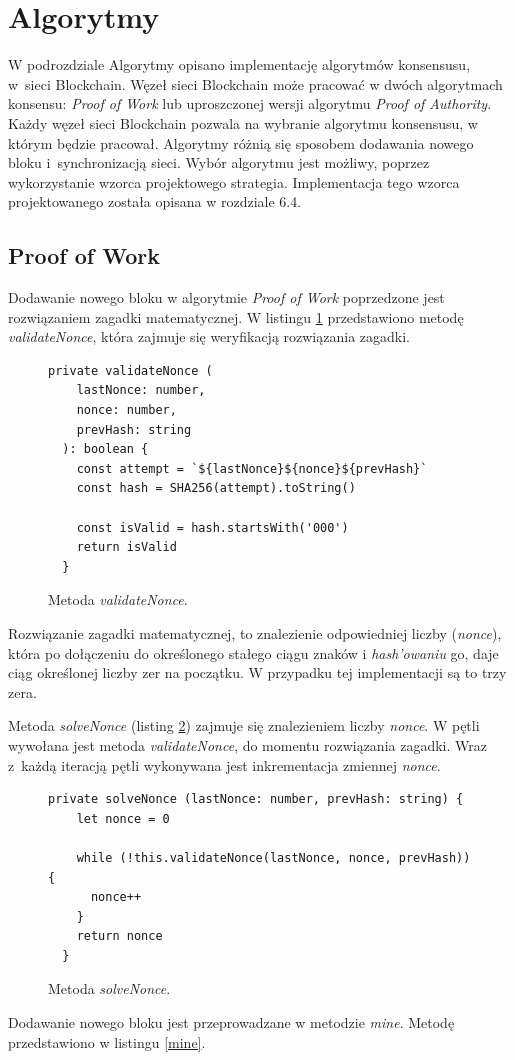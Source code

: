 \documentclass[a4paper,12pt]{book}
\begin{document}
\section{Algorytmy}

W podrozdziale Algorytmy opisano implementację algorytmów konsensusu, w~sieci Blockchain. Węzeł sieci Blockchain może pracować w dwóch algorytmach konsensu: \textit{Proof of Work} lub uproszczonej wersji algorytmu \textit{Proof of Authority}. Każdy węzeł sieci Blockchain pozwala na wybranie algorytmu konsensusu, w którym będzie pracował. Algorytmy różnią się sposobem dodawania nowego bloku i~synchronizacją sieci. Wybór algorytmu jest możliwy, poprzez wykorzystanie wzorca projektowego strategia. Implementacja tego wzorca projektowanego została opisana w rozdziale 6.4.

\subsection{Proof of Work}

Dodawanie nowego bloku w algorytmie \textit{Proof of Work} poprzedzone jest rozwiązaniem zagadki matematycznej. W listingu \ref{validateNonce} przedstawiono metodę \textit{validateNonce}, która zajmuje się weryfikacją rozwiązania zagadki.

\begin{figure}[H]  
  \centering
\begin{lstlisting}[style=ES6]
private validateNonce (
    lastNonce: number,
    nonce: number,
    prevHash: string
  ): boolean {
    const attempt = `${lastNonce}${nonce}${prevHash}`
    const hash = SHA256(attempt).toString()

    const isValid = hash.startsWith('000')
    return isValid
  }
\end{lstlisting}
\caption{Metoda \textit{validateNonce}.}
\label{validateNonce}
\end{figure}
Rozwiązanie zagadki matematycznej, to znalezienie odpowiedniej liczby (\textit{nonce}), która po dołączeniu do określonego stałego ciągu znaków i \textit{hash’owaniu} go, daje ciąg określonej liczby zer na początku. W przypadku tej implementacji są to trzy zera.
 
Metoda \textit{solveNonce} (listing \ref{solveNonce}) zajmuje się znalezieniem liczby \textit{nonce}. W pętli wywołana jest metoda \textit{validateNonce}, do momentu rozwiązania zagadki. Wraz z~każdą iteracją pętli wykonywana jest inkrementacja zmiennej \textit{nonce}.
 
\begin{figure}[H]  
  \centering
\begin{lstlisting}[style=ES6]
private solveNonce (lastNonce: number, prevHash: string) {
    let nonce = 0

    while (!this.validateNonce(lastNonce, nonce, prevHash)) {
      nonce++
    }
    return nonce
  }
\end{lstlisting}
\caption{Metoda \textit{solveNonce}.}
\label{solveNonce}
\end{figure}
Dodawanie nowego bloku jest przeprowadzane w metodzie \textit{mine}. Metodę przedstawiono w listingu \ref{mine}.
\end{document}
